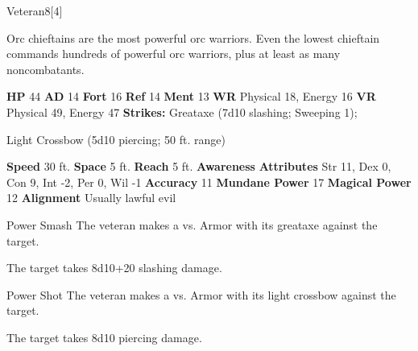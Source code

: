   \begin{monsubsection}{Veteran}{8}[4]
    \vspace{-1em}\vspace{-1em}
    \vspace{0em}

    
          Orc chieftains are the most powerful orc warriors.
          Even the lowest chieftain commands hundreds of powerful orc warriors, plus at least as many noncombatants.
        

    \begin{spellcontent}
      \begin{spelltargetinginfo}
        \pari \textbf{HP} 44 \monsep
          \textbf{AD} 14 \monsep
          \textbf{Fort} 16 \monsep
          \textbf{Ref} 14 \monsep
          \textbf{Ment} 13
        \pari \textbf{WR} Physical 18, Energy 16 \monsep
        \textbf{VR} Physical 49, Energy 47
        \pari \textbf{Strikes:}
            Greataxe  (7d10 slashing; Sweeping 1);
\par Light Crossbow  (5d10 piercing; 50 ft. range)
      \end{spelltargetinginfo}
    \end{spellcontent}
    \begin{monsterfooter}
      \pari \textbf{Speed} 30 ft. \monsep
        \textbf{Space} 5 ft. \monsep
        \textbf{Reach} 5 ft.
      \pari \textbf{Awareness} 
      \pari \textbf{Attributes}
        Str 11, Dex 0,
        Con 9, Int -2,
        Per 0, Wil -1
      \pari \textbf{Accuracy} 11 \monsep
        \textbf{Mundane Power} 17 \monsep
      \textbf{Magical Power} 12
      \pari \textbf{Alignment} Usually lawful evil
    \end{monsterfooter}
  \end{monsubsection}
  \begin{freeability}{Power Smash}
       The veteran makes a 
         vs. Armor
        with its greataxe against the target.
    
    \hit The target takes 8d10+20 slashing damage.
    \end{freeability}
  

    \begin{freeability}{Power Shot}
       The veteran makes a 
         vs. Armor
        with its light crossbow against the target.
    
    \hit The target takes 8d10 piercing damage.
    \end{freeability}
  

